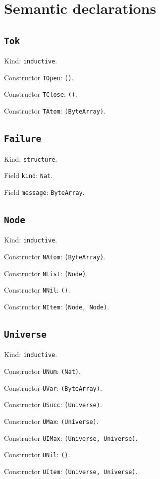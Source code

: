 \documentclass[11pt]{article}
\begin{document}
\section*{Semantic declarations}
\subsection*{\texttt{Tok}}
\noindent Kind: \texttt{inductive}.\par
\noindent Constructor \texttt{TOpen}: \texttt{()}.\par
\noindent Constructor \texttt{TClose}: \texttt{()}.\par
\noindent Constructor \texttt{TAtom}: \texttt{(ByteArray)}.\par
\subsection*{\texttt{Failure}}
\noindent Kind: \texttt{structure}.\par
\noindent Field \texttt{kind}: \texttt{Nat}.\par
\noindent Field \texttt{message}: \texttt{ByteArray}.\par
\subsection*{\texttt{Node}}
\noindent Kind: \texttt{inductive}.\par
\noindent Constructor \texttt{NAtom}: \texttt{(ByteArray)}.\par
\noindent Constructor \texttt{NList}: \texttt{(Node)}.\par
\noindent Constructor \texttt{NNil}: \texttt{()}.\par
\noindent Constructor \texttt{NItem}: \texttt{(Node, Node)}.\par
\subsection*{\texttt{Universe}}
\noindent Kind: \texttt{inductive}.\par
\noindent Constructor \texttt{UNum}: \texttt{(Nat)}.\par
\noindent Constructor \texttt{UVar}: \texttt{(ByteArray)}.\par
\noindent Constructor \texttt{USucc}: \texttt{(Universe)}.\par
\noindent Constructor \texttt{UMax}: \texttt{(Universe)}.\par
\noindent Constructor \texttt{UIMax}: \texttt{(Universe, Universe)}.\par
\noindent Constructor \texttt{UNil}: \texttt{()}.\par
\noindent Constructor \texttt{UItem}: \texttt{(Universe, Universe)}.\par
\end{document}
